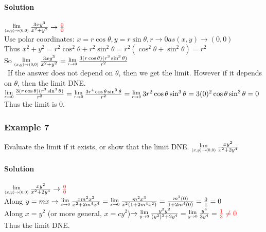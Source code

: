 \documentclass{article}
\newcommand{\Lim}[1]{\raisebox{0.5ex}{\scalebox{0.8}{$\displaystyle \lim_{#1}\;$}}}
\begin{document}
\paragraph{Solution} $\Lim{(x,y)\to(0,0)}\frac{3xy^3}{x^2+y^2}\rightarrow\textcolor{red}{\frac{0}{0}}$
\\Use polar coordinates: $x=r\cos\theta, y=r\sin\theta, r\to0 as (x,y)\to(0,0)$
\\Thus $x^2+y^2=r^2\cos^2\theta+r^2\sin^2\theta=r^2(\cos^2\theta+\sin^2\theta)=r^2$
\\So $\Lim{(x,y)\to(0,0)}\frac{3xy^3}{x^2+y^2}=\Lim{r\to0}\frac{3(r\cos\theta)(r^3\sin^3\theta)}{r^2}$
\\\textbullet\ If the answer does not depend on $\theta$, then we get the limit. However if it depends on $\theta$, then the limit DNE.
\\$\Lim{r\to0}\frac{3(r\cos\theta)(r^3\sin^3\theta)}{r^2}=\Lim{r\to0}\frac{3r^4\cos\theta\sin^3\theta}{r^2}=\Lim{r\to0}3r^2\cos\theta\sin^3\theta=3(0)^2\cos\theta\sin^3\theta=0$
\\Thus the limit is 0.

\subsubsection{Example 7}
Evaluate the limit if it exists, or show that the limit DNE. $\Lim{(x,y)\to(0,0)}\frac{xy^2}{x^2+2y^4}$
\paragraph{Solution} $\Lim{(x,y)\to(0,0)}\frac{xy^2}{x^2+2y^4}\to\textcolor{red}{\frac{0}{0}}$
\\Along $y=mx\to\Lim{x\to0}\frac{xm^2x^2}{x^2+2m^4x^4}=\Lim{x\to0}\frac{m^2x^3}{x^2(1+2m^4x^2)}=\frac{m^2(0)}{1+2m^4(0)}=\frac{0}{1}=0$
\\Along $x=y^2$ (or more general, $x=cy^2$)$\to\Lim{y\to0}\frac{y^2y^2}{(y^2)^2+2y^4}=\Lim{y\to0}\frac{y^4}{3y^4}=\textcolor{red}{\frac{1}{3}\neq0}$
\\Thus the limit DNE.
\end{document}
